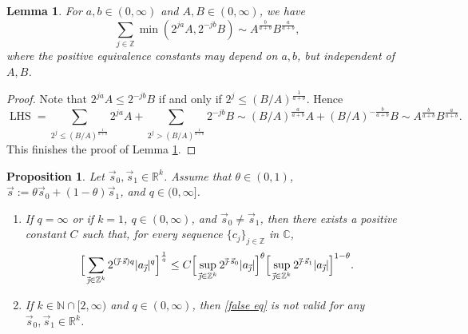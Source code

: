 \documentclass[11pt, reqno]{amsart}
\newtheorem{proposition}[theorem]{Proposition}
\newtheorem{lemma}[theorem]{Lemma}
\theoremstyle{definition}
\theoremstyle{remark}
\numberwithin{equation}{section}
\newcommand{\R}{\mathbb R}
\newcommand{\Z}{\mathbb Z}
\newcommand{\vj}{\vec{\textit{\j}}}
\begin{document}
\begin{lemma}\label{sum-min}
For $a,b\in(0,\infty)$ and $A,B\in(0,\infty)$, we have
\begin{equation*}
  \sum_{j\in\Z}\min( 2^{ja}A,2^{-jb}B)\sim A^{\frac{b}{a+b}}B^{\frac{a}{a+b}},
\end{equation*}
where the positive equivalence constants may depend on $a,b$, but independent of $A,B$.
\end{lemma}

\begin{proof}
Note that $2^{ja}A\leq 2^{-jb}B$ if and only if $2^j\leq(B/A)^{\frac{1}{a+b}}$. Hence
\begin{equation*}
\operatorname{LHS}
=\sum_{2^j\leq (B/A)^{\frac{1}{a+b}}}2^{ja}A+\sum_{2^j>(B/A)^{\frac{1}{a+b}}}2^{-jb}B
\sim (B/A)^{\frac{a}{a+b}}A+(B/A)^{-\frac{b}{a+b}}B\sim A^{\frac{b}{a+b}}B^{\frac{a}{a+b}}.
\end{equation*}
This finishes the proof of Lemma \ref{sum-min}.
\end{proof}

\begin{proposition}\label{BL fail}
Let $\vec s_0,\vec s_1\in\R^k$.
Assume that $\theta\in(0,1)$,
$\vec s:=\theta \vec s_0+(1-\theta) \vec s_1$, and $q\in(0,\infty]$.
\begin{enumerate}[\rm(i)]
\item\label{k=1} If $q=\infty$ or if $k=1$, $q\in(0,\infty)$,
and $\vec s_0\neq\vec s_1$, then
there exists a positive constant $C$ such that,
for every sequence $\{c_j\}_{j\in\Z}$ in $\mathbb C$,
\begin{equation}\label{false eq}
\Big[\sum_{\vj\in\mathbb Z^k} 2^{(\vj\cdot \vec s)q}
|a_{\vj}|^q\Big]^{\frac 1q}
\leq C \Big[\sup_{\vj\in\mathbb Z^k} 2^{\vj\cdot \vec s_0}
|a_{\vj}|\Big]^{\theta}
\Big[\sup_{\vj\in\mathbb Z^k} 2^{\vj\cdot \vec s_1}
|a_{\vj}|\Big]^{1-\theta}.
\end{equation}

\item\label{k>1} If $k\in\mathbb N\cap[2,\infty)$ and $q\in(0,\infty)$,
then \eqref{false eq} is not valid for any $\vec s_0,\vec s_1\in\R^k$.
\end{enumerate}
\end{proposition}
\end{document}
